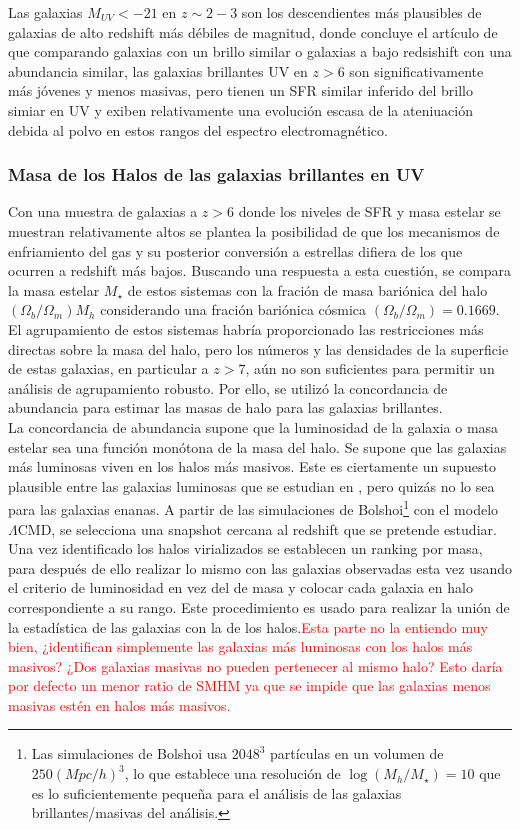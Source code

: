 \documentclass{article}
\begin{document}
Las galaxias $M_{UV}<-21$ en $z\sim 2-3$ son los descendientes más plausibles de galaxias de alto redshift más débiles de magnitud, donde concluye el artículo de \cite{finkelstein2015increasing} que comparando galaxias con un brillo similar o galaxias a bajo redsishift con una abundancia similar, las galaxias brillantes UV en $z>6$ son significativamente más jóvenes y menos masivas, pero tienen un SFR similar inferido del brillo simiar en UV y exiben relativamente una evolución escasa de la ateniuación debida al polvo en estos rangos del espectro electromagnético.\\

\subsubsection*{Masa de los Halos de las galaxias brillantes en UV}
Con una muestra de galaxias a $z>6$ donde los niveles de SFR y masa estelar se muestran relativamente altos se plantea la posibilidad de que los mecanismos de enfriamiento del gas y su posterior conversión a estrellas difiera de los que ocurren a redshift más bajos. Buscando una respuesta a esta cuestión, se compara la masa estelar $M_\star$ de estos sistemas con la fración de masa bariónica del halo $(\Omega_b/\Omega_m)M_h$ considerando una fración bariónica cósmica $(\Omega_b/\Omega_m)=0.1669$. El agrupamiento de estos sistemas habría proporcionado las restricciones más directas sobre la masa del halo, pero los números y las densidades de la superficie de estas galaxias, en particular a $z> 7$, aún no son suficientes para permitir un análisis de agrupamiento robusto. Por ello, se utilizó la concordancia de abundancia para estimar las masas de halo para las galaxias brillantes. \\

La concordancia de abundancia supone que la luminosidad de la galaxia o masa estelar sea una función monótona de la masa del halo. Se supone que las galaxias más luminosas viven en los halos más masivos. Este es ciertamente un supuesto plausible entre las galaxias luminosas que se estudian en \cite{finkelstein2015increasing}, pero quizás no lo sea para las galaxias enanas. A partir de las simulaciones de Bolshoi\footnote{Las simulaciones de Bolshoi usa $2048^3$ partículas en un volumen de $250 (Mpc/h)^3$, lo que establece una resolución de $\log(M_h/M_\star)=10$ que es lo suficientemente pequeña para el análisis de las galaxias brillantes/masivas del análisis.} con el modelo $\Lambda$CMD, se selecciona una snapshot cercana al redshift que se pretende estudiar. Una vez identificado los halos virializados se establecen un ranking por masa, para después de ello realizar lo mismo con las galaxias observadas esta vez usando el criterio de luminosidad en vez del de masa y colocar cada galaxia en halo correspondiente a su rango. Este procedimiento es usado para realizar la unión de la estadística de las galaxias con la de los halos.\textcolor{red}{Esta parte no la entiendo muy bien, ¿identifican simplemente las galaxias más luminosas con los halos más masivos? ¿Dos galaxias masivas no pueden pertenecer al mismo halo? Esto daría por defecto un menor ratio de SMHM ya que se impide que las galaxias menos masivas estén en halos más masivos.}\\
\end{document}
